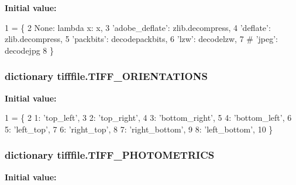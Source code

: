 {\bfseries Initial value\-:}
\begin{DoxyCode}
1 = \{
2     \textcolor{keywordtype}{None}: \textcolor{keyword}{lambda} x: x,
3     \textcolor{stringliteral}{'adobe\_deflate'}: zlib.decompress,
4     \textcolor{stringliteral}{'deflate'}: zlib.decompress,
5     \textcolor{stringliteral}{'packbits'}: decodepackbits,
6     \textcolor{stringliteral}{'lzw'}: decodelzw,
7     \textcolor{comment}{# 'jpeg': decodejpg}
8 \}
\end{DoxyCode}
\hypertarget{namespacetifffile_a60b408f3818fcd0952e6c65de17f926e}{
\subsubsection[{T\-I\-F\-F\-\_\-\-O\-R\-I\-E\-N\-T\-A\-T\-I\-O\-N\-S}]{\setlength{\rightskip}{0pt plus 5cm}dictionary tifffile.\-T\-I\-F\-F\-\_\-\-O\-R\-I\-E\-N\-T\-A\-T\-I\-O\-N\-S}}\label{namespacetifffile_a60b408f3818fcd0952e6c65de17f926e}
{\bfseries Initial value\-:}
\begin{DoxyCode}
1 = \{
2     1: \textcolor{stringliteral}{'top\_left'},
3     2: \textcolor{stringliteral}{'top\_right'},
4     3: \textcolor{stringliteral}{'bottom\_right'},
5     4: \textcolor{stringliteral}{'bottom\_left'},
6     5: \textcolor{stringliteral}{'left\_top'},
7     6: \textcolor{stringliteral}{'right\_top'},
8     7: \textcolor{stringliteral}{'right\_bottom'},
9     8: \textcolor{stringliteral}{'left\_bottom'},
10 \}
\end{DoxyCode}
\hypertarget{namespacetifffile_ae97a49fd3f5aa601ea643775cd7a2cc2}{
\subsubsection[{T\-I\-F\-F\-\_\-\-P\-H\-O\-T\-O\-M\-E\-T\-R\-I\-C\-S}]{\setlength{\rightskip}{0pt plus 5cm}dictionary tifffile.\-T\-I\-F\-F\-\_\-\-P\-H\-O\-T\-O\-M\-E\-T\-R\-I\-C\-S}}\label{namespacetifffile_ae97a49fd3f5aa601ea643775cd7a2cc2}
{\bfseries Initial value\-:}
